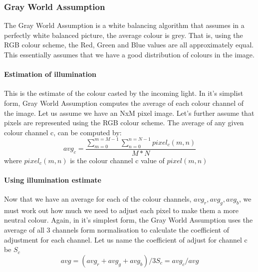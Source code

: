 \documentclass[titlepage]{report}[12pt]
\begin{document}
\subsubsection{Gray World Assumption}
The Gray World Assumption is a white balancing algorithm that assumes in a perfectly white balanced picture, the average colour is grey. That is, using the RGB colour scheme, the Red, Green and Blue values are all approximately equal. This essentially assumes that we have a good distribution of colours in the image.

\paragraph{Estimation of illumination}
This is the estimate of the colour casted by the incoming light. In it's simplist form, Gray World Assumption computes the average of each colour channel of the image. Let us assume we have an NxM pixel image. Let's further assume that pixels are represented using the RGB colour scheme.
The average of any given colour channel c, can be computed by:
\begin{equation}
avg_c = \frac{\sum_{m=0}^{m=M-1} \sum_{n=0}^{n=N-1} pixel_c(m,n) }{M*N} 
\end{equation}
where \begin{math}pixel_c(m,n) \end{math} is the colour channel c value of \begin{math}pixel(m,n)\end{math}

\paragraph{Using illumination estimate}
Now that we have an average for each of the colour channels, \begin{math} avg_r, avg_g, avg_b \end{math}, we must work out how much we need to adjust each pixel to make them a more neutral colour.
Again, in it's simplest form, the Gray World Assumption uses the average of all 3 channels form normalisation to calculate the coefficient of adjustment for each channel. Let us name the coefficient of adjust for channel c be \begin{math} S_c \end{math}
\begin{equation}
avg = (avg_r + avg_g + avg_b) / 3
S_c = avg_c / avg
\end{equation}
\end{document}
